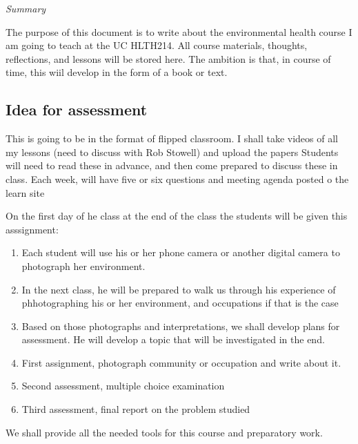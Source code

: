 \textit{Summary} 

The purpose of this document is to write about the environmental health course I am going to teach at the UC HLTH214. All course materials, thoughts, reflections, and lessons will be stored here. The ambition is that, in course of time, this wiil develop in the form of a book or text. 

\subsection{Idea for assessment}

This is going to be in the format of flipped classroom. I shall take videos of all my lessons (need to discuss with Rob Stowell) and upload the papers
Students will need to read these in advance, and then come prepared to discuss these in class.
Each week, will have five or six questions and meeting agenda posted o the learn site

On the first day of he class at the end of the class the students will be given this asssignment:
\begin{enumerate}
\item Each student will use his or her phone camera or another digital camera to photograph her environment.
\item In the next class, he will be prepared to walk us through his experience of phhotographing his or her environment, and occupations if that is the case
\item Based on those photographs and interpretations, we shall develop plans for assessment. He will develop a topic that will be investigated in the end. 
\item First assignment, photograph community or occupation and write about it.
\item Second assessment, multiple choice examination
\item Third assessment, final report on the problem studied

\end{enumerate}

We shall provide all the needed tools for this course and preparatory work. 

  
